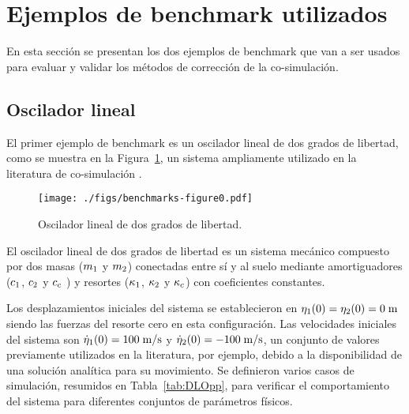 


\section{Ejemplos de benchmark utilizados}
\label{ch:ejemplos}


En esta sección se presentan los dos ejemplos de benchmark que van a ser usados para evaluar y validar los métodos de corrección de la co-simulación.

\subsection{Oscilador lineal}
\label{sec:oscilador}

El primer ejemplo de benchmark es un oscilador lineal de dos grados de libertad, como se muestra en la Figura~\ref{fig:OsciladorLinealMono}, un sistema ampliamente utilizado en la literatura de co-simulación \cite{Gonzalez2011,Schweizer2015,Gomes2018,Gonzalez2019}.

\begin{figure}[ht!]\centering
	\texttt{[image: ./figs/benchmarks-figure0.pdf]}
	\caption{Oscilador lineal de dos grados de libertad.}
	\label{fig:OsciladorLinealMono}
\end{figure}

El oscilador lineal de dos grados de libertad es un sistema mecánico compuesto por dos masas ($m_1$ y $m_2$) conectadas entre sí y al suelo mediante amortiguadores ($c_1$, $c_2$ y $c_c$ ) y resortes ($\kappa_1$, $\kappa_2$ y $\kappa_c$) con coeficientes constantes.

Los desplazamientos iniciales del sistema se establecieron en $\eta_1(0) = \eta_2(0) = 0{\; \mathrm {m}}$ siendo las fuerzas del resorte cero en esta configuración.
Las velocidades iniciales del sistema son $\dot{\eta}_1(0) = 100{\; \mathrm {m/s}}$ y $\dot{\eta}_2(0) = -100{\; \mathrm {m/s}}$, un conjunto de valores previamente utilizados en la literatura, por ejemplo, \cite{Schweizer2014,Schweizer2015a,Gonzalez2019} debido a la disponibilidad de una solución analítica para su movimiento.
Se definieron varios casos de simulación, resumidos en Tabla~\ref{tab:DLOpp}, para verificar el comportamiento del sistema para diferentes conjuntos de parámetros físicos.


